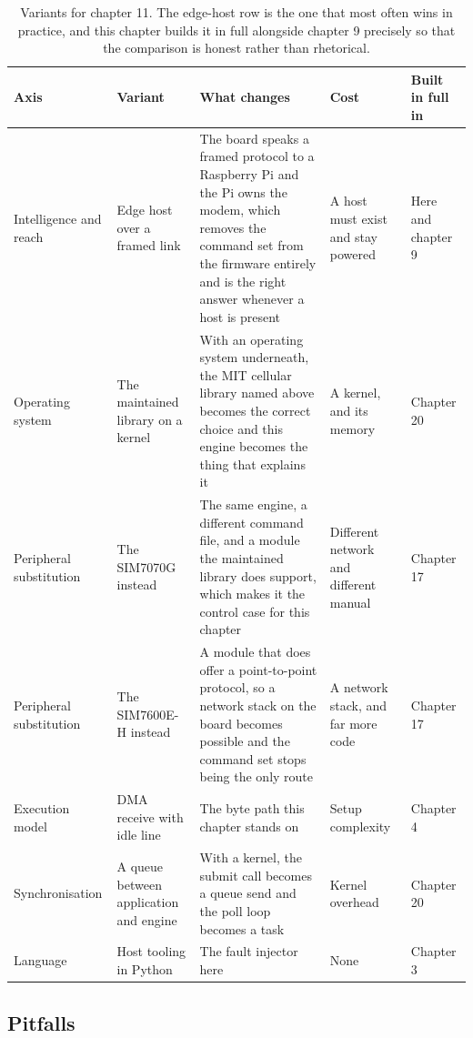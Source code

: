 \begin{table}[H]\centering\small
\begin{tabular}{p{24mm}p{26mm}p{44mm}p{22mm}p{20mm}}
\toprule
Axis & Variant & What changes & Cost & Built in full in \\
\midrule
Intelligence and reach & Edge host over a framed link & The board speaks a framed protocol to a Raspberry Pi and the Pi owns the modem, which removes the command set from the firmware entirely and is the right answer whenever a host is present & A host must exist and stay powered & Here and chapter 9 \\
Operating system & The maintained library on a kernel & With an operating system underneath, the MIT cellular library named above becomes the correct choice and this engine becomes the thing that explains it & A kernel, and its memory & Chapter 20 \\
Peripheral substitution & The SIM7070G instead & The same engine, a different command file, and a module the maintained library does support, which makes it the control case for this chapter & Different network and different manual & Chapter 17 \\
Peripheral substitution & The SIM7600E-H instead & A module that does offer a point-to-point protocol, so a network stack on the board becomes possible and the command set stops being the only route & A network stack, and far more code & Chapter 17 \\
Execution model & DMA receive with idle line & The byte path this chapter stands on & Setup complexity & Chapter 4 \\
Synchronisation & A queue between application and engine & With a kernel, the submit call becomes a queue send and the poll loop becomes a task & Kernel overhead & Chapter 20 \\
Language & Host tooling in Python & The fault injector here & None & Chapter 3 \\
\bottomrule
\end{tabular}
\caption{Variants for chapter 11. The edge-host row is the one that most often wins in practice, and this chapter builds it in full alongside chapter 9 precisely so that the comparison is honest rather than rhetorical.}
\end{table}

\subsection*{Pitfalls}


